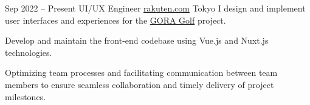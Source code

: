 \cventry
  {Sep 2022 – Present}
  {UI/UX Engineer}
  {\href{https://global.rakuten.com/corp/}{rakuten.com}}
  {Tokyo}
  {}
  {I design and implement user interfaces and experiences for the \href{https://gora.golf.rakuten.co.jp/}{GORA Golf} project.}

\cvlistitem
  {Develop and maintain the front-end codebase using Vue.js and Nuxt.js technologies.}

\cvlistitem
  {Optimizing team processes and facilitating communication between team members to ensure seamless collaboration and timely delivery of project milestones.}
